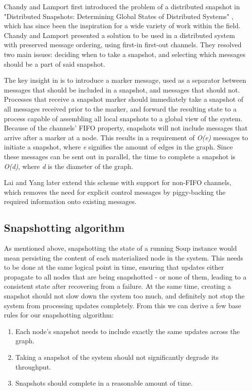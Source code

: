 \documentclass[b5paper]{report}
\begin{document}
Chandy and Lamport first introduced the problem of a distributed snapshot in
"Distributed Snapshots: Determining Global States of Distributed Systems"
\cite{chandy-lamport}, which has since been the inspiration for a wide variety
of work within the field. Chandy and Lamport presented a solution to be used in
a distributed system with preserved message ordering, using first-in first-out
channels. They resolved two main issues: deciding when to take a snapshot, and
selecting which messages should be a part of said snapshot.

The key insight in \cite{chandy-lamport} is to introduce a marker message, used
as a separator between messages that should be included in a snapshot, and
messages that should not. Processes that receive a snapshot marker should
immediately take a snapshot of all messages received prior to the marker, and
forward the resulting state to a process capable of assembling all local
snapshots to a global view of the system. Because of the channels' FIFO
property, snapshots will not include messages that arrive after a marker at a
node. This results in a requirement of \textit{O(e)} messages to initiate a
snapshot, where \textit{e} signifies the amount of edges in the graph. Since
these messages can be sent out in parallel, the time to complete a snapshot is
\textit{O(d)}, where \textit{d} is the diameter of the graph.

Lai and Yang \cite{lai-yang} later extend this scheme with support for non-FIFO
channels, which removes the need for explicit control messages by piggy-backing
the required information onto existing messages.

\subsection{Snapshotting algorithm}
As mentioned above, snapshotting the state of a running Soup instance would mean
persisting the content of each materialized node in the system. This needs to be
done at the same logical point in time, ensuring that updates either
propagate to all nodes that are being snapshotted - or none of them, leading to
a consistent state after recovering from a failure. At the same time,
creating a snapshot should not slow down the system too much, and definitely not
stop the system from processing updates completely. From this we can derive a
few base rules for our snapshotting algorithm:

\begin{enumerate}
  \item Each node's snapshot needs to include exactly the same updates across
    the graph.
  \item Taking a snapshot of the system should not significantly degrade its
    throughput.
  \item Snapshots should complete in a reasonable amount of time.
\end{enumerate}
\end{document}
